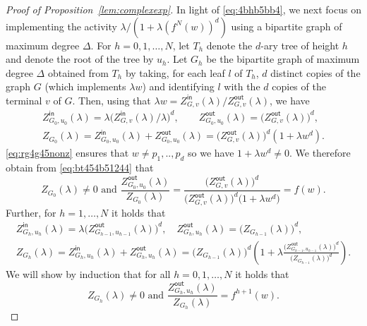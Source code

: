 \documentclass[11pt]{article}
\def\Zin{Z^{\mathsf{in}}}
\def\Zout{Z^{\mathsf{out}}}
\newcommand{\fn}[2]{#1^{#2}}
\begin{document}
\begin{proof}[Proof of Proposition~\ref{lem:complexexp}]
In light of \eqref{eq:4bhb5bb4}, we next focus on implementing the activity $\lambda/(1+\lambda (f^{N}(w))^{d})$ using a bipartite graph of maximum degree $\Delta$. For $h= 0,1,\hdots,N$, let $T_h$ denote the $d$-ary tree of height $h$ and denote the root of the tree by $u_h$. Let $G_h$ be the bipartite graph of maximum degree $\Delta$ obtained from $T_h$ by taking, for each leaf $l$ of $T_h$, $d$ distinct copies of the graph $G$ (which implements $\lambda w$) and identifying $l$ with the $d$ copies of the terminal $v$ of $G$. Then, using that $\lambda w=\Zin_{G,v}(\lambda)/\Zout_{G,v}(\lambda)$, we have
\begin{equation}\label{eq:bt454b51244}
\begin{gathered}
\Zin_{G_0,u_0}(\lambda)=\lambda\big(\Zin_{G,v}(\lambda)/\lambda\big)^{d}, \qquad \Zout_{G_0,u_0}(\lambda)=\big(\Zout_{G,v}(\lambda)\big)^{d},\\
Z_{G_0}(\lambda)=\Zin_{G_0,u_{0}}(\lambda)+\Zout_{G_0,u_{0}}(\lambda)=\big(\Zout_{G,v}(\lambda)\big)^{d}(1+\lambda w^d).
\end{gathered}
\end{equation}
\eqref{eq:rg4g45nonz} ensures that $w \neq p_1,..,p_d$ so we have $1 + \lambda w^d \neq 0$. We therefore obtain from \eqref{eq:bt454b51244} that
\begin{equation}\label{eq:btb45b3f}
Z_{G_0}(\lambda)\neq 0 \mbox{ and }\frac{\Zout_{G_0,u_0}(\lambda)}{Z_{G_0}(\lambda)}=\frac{\big(\Zout_{G,v}(\lambda)\big)^{d}}{\big(\Zout_{G,v}(\lambda)\big)^{d}\big(1+\lambda w^d\big)}=f(w).
\end{equation}
Further, for $h=1,\hdots, N$ it holds that
\begin{equation}\label{eq:um76h6h6r}
\begin{gathered}
\Zin_{G_h,u_h}(\lambda)=\lambda\big(\Zout_{G_{h-1},u_{h-1}}(\lambda)\big)^{d}, \quad \Zout_{G_h,u_h}(\lambda)=\big(Z_{G_{h-1}}(\lambda)\big)^{d},\\
Z_{G_h}(\lambda)=\Zin_{G_h,u_h}(\lambda)+\Zout_{G_h,u_h}(\lambda)=\big(Z_{G_{h-1}}(\lambda)\big)^{d}\left(1+\lambda \frac{\big(\Zout_{G_{h-1},u_{h-1}}(\lambda)\big)^d}{\big(Z_{G_{h-1}}(\lambda)\big)^d}\right).
\end{gathered}
\end{equation}
We will show by induction that for all $h=0,1,\hdots,N$ it holds that
\begin{equation}\label{eq:mm4545mg4f5}
Z_{G_h}(\lambda)\neq 0\mbox{ and } \frac{\Zout_{G_h,u_h}(\lambda)}{Z_{G_h}(\lambda)} = \fn{f}{h+1}(w).
\end{equation}

\end{proof}
\end{document}
